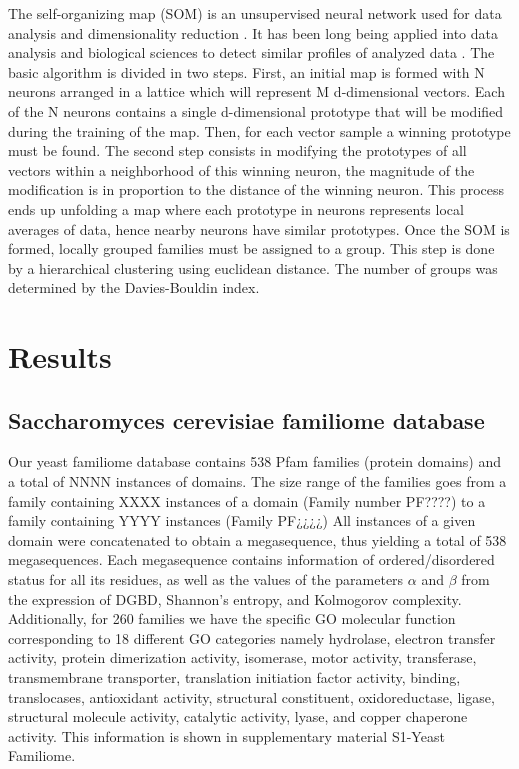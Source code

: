 \documentclass[preprint,12pt]{elsarticle}
\begin{document}
The self-organizing map (SOM) is an unsupervised neural network used for data analysis and dimensionality reduction \cite{kohonen2013essentials}. It has been long being applied into data analysis and biological sciences to detect similar profiles of analyzed data \cite{wang2002clustering, nurminen2018impact}. The basic algorithm is divided in two steps. First, an initial map is formed with N neurons arranged in a lattice which will represent M d-dimensional vectors. Each of the N neurons contains a single d-dimensional prototype that will be modified during the training of the map. Then, for each vector sample a winning prototype must be found. The second step consists in modifying the prototypes of all vectors within a neighborhood of this winning neuron, the magnitude of the modification is in proportion to the distance of the winning neuron. This process ends up unfolding a map where each prototype in neurons represents local averages of data, hence nearby neurons have similar prototypes.
Once the SOM is formed, locally grouped families must be assigned to a group. This step is done by a hierarchical clustering using euclidean distance. The number of groups was determined by the Davies-Bouldin index.


\section{Results}
\label{S:1}

\subsection{Saccharomyces cerevisiae familiome database}



\bigbreak
Our yeast familiome database contains 538 Pfam families (protein domains) and a total of NNNN instances of domains. The size range of the families goes from a family containing XXXX instances of a domain (Family number PF????) to a family containing YYYY instances (Family PF¿¿¿¿) All instances of a given domain were concatenated to obtain a megasequence, thus yielding a total of 538 megasequences. Each megasequence contains information of ordered/disordered status for all its residues, as well as the values of the parameters $\alpha$ and $\beta$ from the expression of DGBD, Shannon's entropy, and Kolmogorov complexity. Additionally, for 260 families we have the specific GO molecular function corresponding to 18 different GO categories namely hydrolase, electron transfer activity, protein dimerization activity, isomerase, motor activity, transferase, transmembrane transporter, translation initiation factor activity, binding, translocases, antioxidant activity, structural constituent, oxidoreductase, ligase, structural molecule activity, catalytic activity, lyase, and copper chaperone activity. This information is shown in supplementary material S1-Yeast Familiome.
\end{document}
